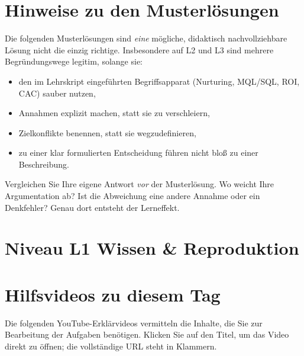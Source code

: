 \documentclass[11pt,a4paper,oneside]{article}
\begin{document}
\section*{Hinweise zu den Musterlösungen}
\thispagestyle{plain}

\noindent Die folgenden Musterlösungen sind \emph{eine} mögliche, didaktisch nachvollziehbare Lösung \textendash{} nicht die einzig richtige. Insbesondere auf L2 und L3 sind mehrere Begründungswege legitim, solange sie:

\begin{itemize}
  \item den im Lehrskript eingeführten Begriffsapparat (Nurturing, MQL/SQL, ROI, CAC) sauber nutzen,
  \item Annahmen explizit machen, statt sie zu verschleiern,
  \item Zielkonflikte benennen, statt sie wegzudefinieren,
  \item zu einer klar formulierten Entscheidung führen \textendash{} nicht bloß zu einer Beschreibung.
\end{itemize}

\begin{infobox}
Vergleichen Sie Ihre eigene Antwort \emph{vor} der Musterlösung. Wo weicht Ihre Argumentation ab? Ist die Abweichung eine andere Annahme \textendash{} oder ein Denkfehler? Genau dort entsteht der Lerneffekt.
\end{infobox}

\clearpage

\section*{Niveau L1 \textendash{} Wissen \& Reproduktion}

\section*{Hilfsvideos zu diesem Tag}
\thispagestyle{plain}

\noindent Die folgenden YouTube-Erkl\"arvideos vermitteln die Inhalte, die Sie zur Bearbeitung der Aufgaben ben\"otigen. Klicken Sie auf den Titel, um das Video direkt zu \"offnen; die vollst\"andige URL steht in Klammern.
\end{document}
